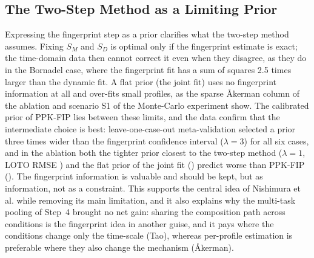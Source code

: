 \subsection{The Two-Step Method as a Limiting Prior}
Expressing the fingerprint step as a prior clarifies what the two-step method assumes. Fixing $S_M$ and $S_D$ is optimal only if the fingerprint estimate is exact; the time-domain data then cannot correct it even when they disagree, as they do in the Bornadel case, where the fingerprint fit has a sum of squares 2.5 times larger than the dynamic fit. A flat prior (the joint fit) uses no fingerprint information at all and over-fits small profiles, as the sparse Åkerman column of the ablation and scenario S1 of the Monte-Carlo experiment show. The calibrated prior of PPK-FIP lies between these limits, and the data confirm that the intermediate choice is best: leave-one-case-out meta-validation selected a prior three times wider than the fingerprint confidence interval ($\lambda=3$) for all six cases, and in the ablation both the tighter prior closest to the two-step method ($\lambda=1$, LOTO RMSE \AblLamOne) and the flat prior of the joint fit (\AblJoint) predict worse than PPK-FIP (\LotoAllNew). The fingerprint information is valuable and should be kept, but as information, not as a constraint. This supports the central idea of Nishimura et al. while removing its main limitation, and it also explains why the multi-task pooling of Step~4 brought no net gain: sharing the composition path across conditions is the fingerprint idea in another guise, and it pays where the conditions change only the time-scale (Tao), whereas per-profile estimation is preferable where they also change the mechanism (Åkerman).

